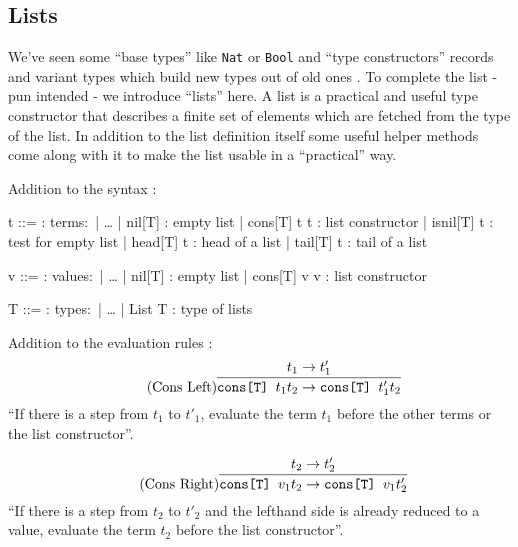 \subsection{Lists}

We've seen some ``base types'' like \texttt{Nat} or \texttt{Bool}
and ``type constructors'' records and variant types which build
new types out of old ones \cite{pierce2002ProgLang}.
To complete the list - pun intended - we introduce
``lists'' here. A list is a practical and useful type constructor
that describes a finite set of elements which are fetched from the
type of the list.
In addition to the list definition itself some useful helper
methods come along with it to make the list usable in a ``practical''
way.

Addition to the syntax \cite{pierce2002ProgLang}:
\begin{bnfgrammar}
    t ::= : terms$\colon$
    | \dots
    | nil[T] : empty list
    | cons[T] t t : list constructor
    | isnil[T] t : test for empty list
    | head[T] t : head of a list
    | tail[T] t : tail of a list
\end{bnfgrammar}\leavevmode\newline

\begin{bnfgrammar}
    v ::= : values$\colon$
    | \dots
    | nil[T] : empty list
    | cons[T] v v : list constructor
\end{bnfgrammar}\leavevmode\newline

\begin{bnfgrammar}
    T ::= : types$\colon$
    | \dots
    | List T : type of lists
\end{bnfgrammar}\leavevmode\newline

Addition to the evaluation rules \cite{pierce2002ProgLang}:
\begin{equation*}
    \tag{Cons Left}
    \infer{
        \texttt{cons[T] } t_1 t_2 \rightarrow \texttt{cons[T] } t'_1 t_2
    }{
        t_1 \rightarrow t'_1
    }
\end{equation*}
``If there is a step from $t_1$ to $t'_1$, evaluate the term $t_1$
before the other terms or the list constructor''.

\begin{equation*}
    \tag{Cons Right}
    \infer{
        \texttt{cons[T] } v_1 t_2 \rightarrow \texttt{cons[T] } v_1 t'_2
    }{
        t_2 \rightarrow t'_2
    }
\end{equation*}
``If there is a step from $t_2$ to $t'_2$ and the lefthand side
is already reduced to a value, evaluate the term $t_2$
before the list constructor''.

